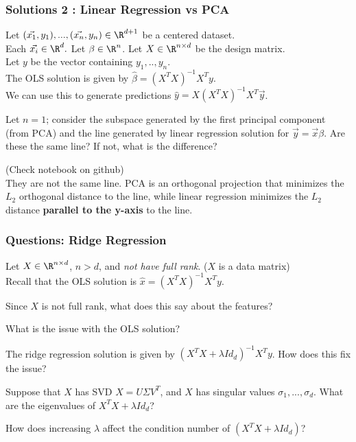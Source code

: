 \documentclass{beamer}
\renewenvironment{enumerate}%
{\begin{list}{\arabic{enumi}.}%
      {\setlength{\leftmargin}{2.5em}%
       \setlength{\itemsep}{-\parsep}%
       \setlength{\topsep}{-\parskip}%
       \usecounter{enumi}}%
 }{\end{list}}
\begin{document}
\begin{frame}
\frametitle{Solutions 2 : Linear Regression vs PCA}
Let $(\vec{x_1},y_1),...,(\vec{x_n},y_n) \in \R^{d+1}$ be a centered dataset.\\
Each $\vec{x_i}\in\R^d.$ Let $\beta \in \R^n$. Let $X\in\R^{n\times d}$ be the design matrix.\\
Let $y$ be the vector containing $y_1,..,y_n$.\\
The OLS solution is given by $\hat{\beta} = (X^TX)^{-1}X^Ty$.  \\
We can use this to generate predictions $\hat{y} = X(X^TX)^{-1}X^T\vec{y}$.\\
\begin{enumerate}
\item[2.] Let $n = 1$; consider the subspace generated by the first principal component (from PCA) and the line generated by linear regression solution for $\vec{y}=\vec{x}\beta$.
Are these the same line? If not, what is the difference?
\begin{solution}
(Check notebook on github)\\
They are not the same line. PCA is an orthogonal projection that minimizes the $L_2$ orthogonal distance to the line,
 while linear regression minimizes the $L_2$ distance \textbf{parallel to the y-axis} to the line.
\end{solution}
\end{enumerate}
\end{frame}


\begin{frame}
\frametitle{Questions: Ridge Regression}
Let $X \in \R^{n\times d}$, $n>d$, and \textit{not have full rank}. ($X$ is a data matrix) \\
Recall that the OLS solution is $\hat{x} = (X^TX)^{-1}X^Ty$.
\begin{enumerate}
\item Since $X$ is not full rank, what does this say about the features?
\item What is the issue with the OLS solution?
\item The ridge regression solution is given by $(X^TX+\lambda Id_d)^{-1}X^Ty$. How does this fix the issue?
\item Suppose that $X$ has SVD $X=U\Sigma V^T$, and $X$ has singular values $\sigma_1,...,\sigma_d$. What are the eigenvalues of 
$X^TX + \lambda Id_d$?
\item How does increasing $\lambda$ affect the condition number of $(X^TX + \lambda Id_d)$?
\end{enumerate}
\end{frame}
\end{document}
